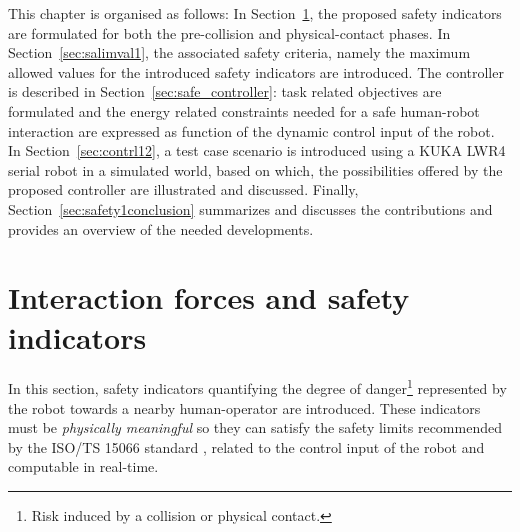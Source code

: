 This chapter is organised as follows: In Section~\ref{sec:inter1}, the proposed safety indicators are formulated for both the pre-collision and physical-contact phases. In Section~\ref{sec:salimval1}, the associated safety criteria, namely the maximum allowed values for the introduced safety indicators are introduced. The controller is described in Section~\ref{sec:safe_controller}: task related objectives are formulated and the energy related constraints needed for a safe human-robot interaction are expressed as function of the dynamic control input of the robot. In Section~\ref{sec:contrl12}, a test case scenario is introduced using a KUKA LWR4 serial robot in a simulated world, based on which, the possibilities offered by the proposed controller are illustrated and discussed. Finally, Section~\ref{sec:safety1conclusion} summarizes and discusses the contributions and provides an overview of the needed developments.
\section{Interaction forces and safety indicators}
\label{sec:inter1}
In this section, safety indicators quantifying the degree of danger\footnote{Risk induced by a collision or physical contact.} represented by the robot towards a nearby human-operator are introduced. These indicators must be \textit{physically meaningful} so they can satisfy the safety limits recommended by the ISO/TS 15066 standard \cite{ISO15066PDF}, related to the control input of the robot and computable in real-time. 
%


